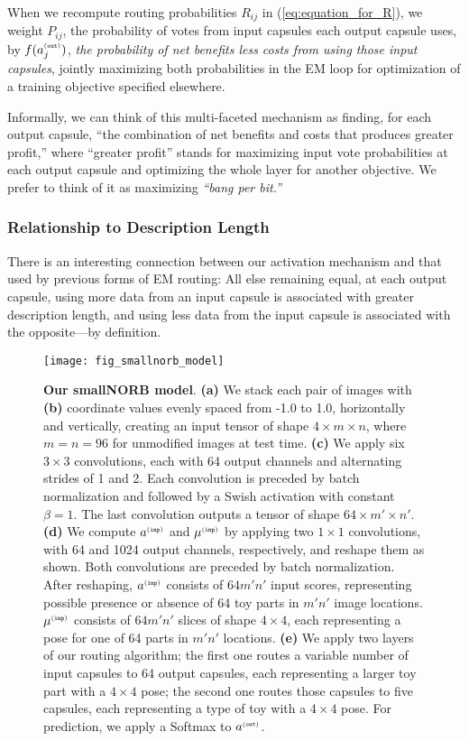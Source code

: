\documentclass[11pt,a4paper]{article}
\begin{document}
When we recompute routing probabilities $R_{ij}$ in (\ref{eq:equation_for_R}), we weight $P_{ij}$, the probability of votes from input capsules each output capsule uses, by $f(a^{{\scriptscriptstyle\tt (out)}}_j)$, {\em the probability of net benefits less costs from using those input capsules}, jointly maximizing both probabilities in the EM loop for optimization of a training objective specified elsewhere.

Informally, we can think of this multi-faceted mechanism as finding, for each output capsule, ``the combination of net benefits and costs that produces greater profit,'' where ``greater profit'' stands for maximizing input vote probabilities at each output capsule and optimizing the whole layer for another objective. We prefer to think of it as maximizing \emph{``bang per bit.''}

\subsubsection{Relationship to Description Length}

There is an interesting connection between our activation mechanism and that used by previous forms of EM routing: All else remaining equal, at each output capsule, using more data from an input capsule is associated with greater description length, and using less data from the input capsule is associated with the opposite---by definition.


\begin{figure*}[t]
	\vskip 0.1in
	\begin{center}
		\centerline{\texttt{[image: fig\_smallnorb\_model]}}
		\caption{\textbf{Our smallNORB model}. \textbf{(a)} We stack each pair of images with \textbf{(b)} coordinate values evenly spaced from -1.0 to 1.0, horizontally and vertically, creating an input tensor of shape $4 \times m \times n$, where $m = n = 96$ for unmodified images at test time. \textbf{(c)} We apply six $3 \times 3$ convolutions, each with 64 output channels and alternating strides of 1 and 2. Each convolution is preceded by batch normalization and followed by a Swish activation \cite{DBLP:journals/corr/abs-1710-05941} with constant $\beta = 1$. The last convolution outputs a tensor of shape $64 \times m' \times n'$. \textbf{(d)} We compute $a^{{\scriptscriptstyle\tt (inp)}}$ and $\mu^{{\scriptscriptstyle\tt (inp)}}$ by applying two $1 \times 1$ convolutions, with 64 and 1024 output channels, respectively, and reshape them as shown. Both convolutions are preceded by batch normalization. After reshaping, $a^{{\scriptscriptstyle\tt (inp)}}$ consists of $64m'n'$ input scores, representing possible presence or absence of 64 toy parts in $m'n'$ image locations. $\mu^{{\scriptscriptstyle\tt (inp)}}$ consists of $64m'n'$ slices of shape $4 \times 4$, each representing a pose for one of 64 parts in $m'n'$ locations. \textbf{(e)} We apply two layers of our routing algorithm; the first one routes a variable number of input capsules to 64 output capsules, each representing a larger toy part with a $4 \times 4$ pose; the second one routes those capsules to five capsules, each representing a type of toy with a $4 \times 4$ pose. For prediction, we apply a Softmax to $a^{{\scriptscriptstyle\tt (out)}}$.}
		\label{fig:smallnorb_model}
	\end{center}
	\vskip -0.2in
\end{figure*} 
\end{document}
